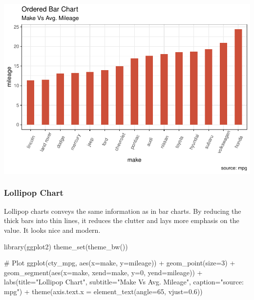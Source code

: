 \documentclass[a4paper]{article}
\newenvironment{Shaded}{}{}
\newcommand{\KeywordTok}[1]{\textcolor[rgb]{0.00,0.00,1.00}{#1}}
\newcommand{\DataTypeTok}[1]{#1}
\newcommand{\DecValTok}[1]{#1}
\newcommand{\FloatTok}[1]{#1}
\newcommand{\StringTok}[1]{\textcolor[rgb]{0.00,0.50,0.50}{#1}}
\newcommand{\CommentTok}[1]{\textcolor[rgb]{0.00,0.50,0.00}{#1}}
\newcommand{\OperatorTok}[1]{#1}
\newcommand{\NormalTok}[1]{#1}
\begin{document}
\includegraphics{M24-ggplot2_Gallery_files/figure-latex/unnamed-chunk-17-1.pdf}

\newpage

\subsubsection{Lollipop Chart}\label{lollipop-chart}

Lollipop charts conveys the same information as in bar charts. By
reducing the thick bars into thin lines, it reduces the clutter and lays
more emphasis on the value. It looks nice and modern.

\begin{Shaded}
\begin{Highlighting}[]
\KeywordTok{library}\NormalTok{(ggplot2)}
\KeywordTok{theme_set}\NormalTok{(}\KeywordTok{theme_bw}\NormalTok{())}

\CommentTok{# Plot}
\KeywordTok{ggplot}\NormalTok{(cty_mpg, }\KeywordTok{aes}\NormalTok{(}\DataTypeTok{x=}\NormalTok{make, }\DataTypeTok{y=}\NormalTok{mileage)) }\OperatorTok{+}\StringTok{ }
\StringTok{  }\KeywordTok{geom_point}\NormalTok{(}\DataTypeTok{size=}\DecValTok{3}\NormalTok{) }\OperatorTok{+}\StringTok{ }
\StringTok{  }\KeywordTok{geom_segment}\NormalTok{(}\KeywordTok{aes}\NormalTok{(}\DataTypeTok{x=}\NormalTok{make, }
                   \DataTypeTok{xend=}\NormalTok{make, }
                   \DataTypeTok{y=}\DecValTok{0}\NormalTok{, }
                   \DataTypeTok{yend=}\NormalTok{mileage)) }\OperatorTok{+}\StringTok{ }
\StringTok{  }\KeywordTok{labs}\NormalTok{(}\DataTypeTok{title=}\StringTok{"Lollipop Chart"}\NormalTok{, }
       \DataTypeTok{subtitle=}\StringTok{"Make Vs Avg. Mileage"}\NormalTok{, }
       \DataTypeTok{caption=}\StringTok{"source: mpg"}\NormalTok{) }\OperatorTok{+}\StringTok{ }
\StringTok{  }\KeywordTok{theme}\NormalTok{(}\DataTypeTok{axis.text.x =} \KeywordTok{element_text}\NormalTok{(}\DataTypeTok{angle=}\DecValTok{65}\NormalTok{, }\DataTypeTok{vjust=}\FloatTok{0.6}\NormalTok{))}
\end{Highlighting}
\end{Shaded}
\end{document}

